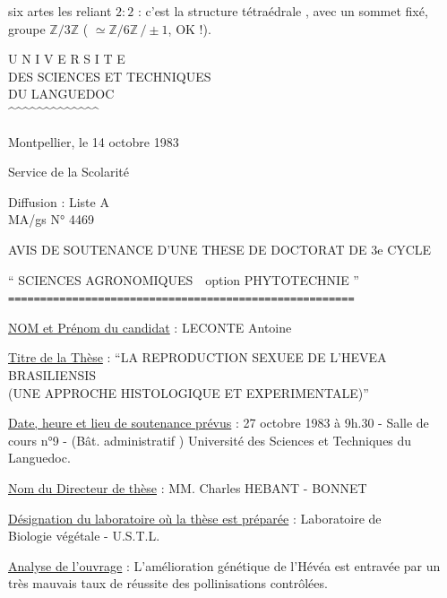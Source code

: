 six artes les reliant $2:2$ : c'est la
structure tétraédrale , avec un sommet
fixé, groupe  $\mathbb Z/3\mathbb Z$
( $\simeq\mathbb Z/6\mathbb Z\,/\pm1$, OK !).



\begin{center}
U N I V E R S I T E\\
DES SCIENCES ET TECHNIQUES\\
DU LANGUEDOC\\
\textasciicircum\textasciicircum\textasciicircum\textasciicircum\textasciicircum\textasciicircum\textasciicircum\textasciicircum\textasciicircum\textasciicircum\textasciicircum\textasciicircum\textasciicircum
\end{center}

Montpellier, le 14 octobre 1983

Service de la Scolarité

Diffusion : Liste A\\
MA/gs \hfill N° 4469

\begin{center}
AVIS DE SOUTENANCE D'UNE THESE DE DOCTORAT DE 3e CYCLE

`` SCIENCES AGRONOMIQUES\ \ option PHYTOTECHNIE ''\\
\texttt{======================================================}
\end{center}

\uline{NOM et Prénom du candidat} : LECONTE Antoine

\uline{Titre de la Thèse} : ``LA REPRODUCTION SEXUEE DE L'HEVEA BRASILIENSIS\\
(UNE APPROCHE HISTOLOGIQUE ET EXPERIMENTALE)''

\uline{Date, heure et lieu de soutenance prévus} : 27 octobre 1983 à 9h.30 - Salle de cours n°9 - (Bât. administratif ) Université des Sciences et Techniques du Languedoc.

\uline{Nom du Directeur de thèse} : MM. Charles HEBANT - BONNET

\uline{Désignation du laboratoire où la thèse est préparée} : Laboratoire de\\
Biologie végétale - U.S.T.L.\hfill\handwritten{\unsure{\textbackslash}}

\uline{Analyse de l'ouvrage} : L'amélioration génétique de l'Hévéa est entravée par un très mauvais taux de réussite des pollinisations contrôlées.

